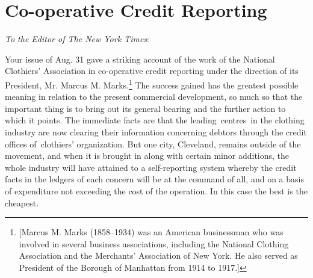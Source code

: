 \documentclass[openany,nobib]{tufte-book}
\let\oldchapter\chapter
\def\chapter{%
  \setcounter{footnote}{0}%
  \oldchapter
}
\begin{document}
\chapter[Co-operative Credit Reporting]{Co-operative Credit Reporting}
\label{ch:Co-operative Credit Reporting}

\vspace{.2in}

\begin{LARGE}


\end{LARGE}

\vspace{0.4in}


\noindent\emph{To the Editor of The New York Times}:

\vspace{0.1in}

Your issue of Aug. 31 gave a striking account of the work of the
National Clothiers' Association in co-operative credit reporting under
the direction of its President, Mr. Marcus M. Marks.\footnote{{[}Marcus
  M. Marks (1858--1934) was an American businessman who was involved in
  several business associations, including the National Clothing
  Association and the Merchants' Association of New York. He also served
  as President of the Borough of Manhattan from 1914 to 1917.{]}} The
success gained has the greatest possible meaning in relation to the
present commercial development, so much so that the important thing is
to bring out its general bearing and the further action to which it
points. The immediate facts are that the leading~centres~in the clothing
industry are now clearing their information concerning debtors through
the credit offices of~clothiers' organization. But one city, Cleveland,
remains outside of the movement, and when it is brought in along with
certain minor additions, the whole industry will have attained to a
self-reporting system whereby the credit facts in the ledgers of each
concern will be at the command of all, and on a basis of expenditure not
exceeding the cost of the operation. In this case the best is the
cheapest.~
\end{document}
